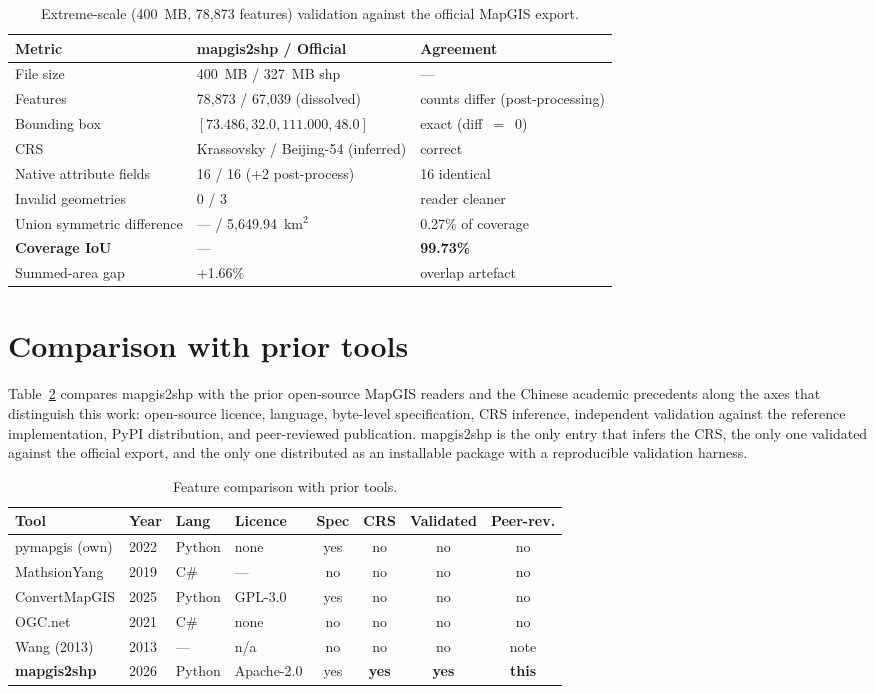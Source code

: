 \documentclass[11pt,a4paper]{article}
\begin{document}
\begin{table}[h]
\centering
\caption{Extreme-scale (400~MB, 78{,}873 features) validation against the official MapGIS export.}
\label{tab:large}
\begin{tabular}{lll}
\toprule
Metric & mapgis2shp / Official & Agreement \\
\midrule
File size & 400~MB / 327~MB shp & --- \\
Features & 78{,}873 / 67{,}039 (dissolved) & counts differ (post-processing) \\
Bounding box & $[73.486, 32.0, 111.000, 48.0]$ & exact (diff~$=$~0) \\
CRS & Krassovsky / Beijing-54 (inferred) & correct \\
Native attribute fields & 16 / 16 (+2 post-process) & 16 identical \\
Invalid geometries & 0 / 3 & reader cleaner \\
Union symmetric difference & --- / 5{,}649.94~km$^{2}$ & 0.27\% of coverage \\
\textbf{Coverage IoU} & --- & \textbf{99.73\%} \\
Summed-area gap & +1.66\% & overlap artefact \\
\bottomrule
\end{tabular}
\end{table}

\section{Comparison with prior tools}
Table~\ref{tab:tools} compares mapgis2shp with the prior open-source MapGIS readers and the Chinese academic precedents along the axes that distinguish this work: open-source licence, language, byte-level specification, CRS inference, independent validation against the reference implementation, PyPI distribution, and peer-reviewed publication. mapgis2shp is the only entry that infers the CRS, the only one validated against the official export, and the only one distributed as an installable package with a reproducible validation harness.

\begin{table}[h]
\centering
\caption{Feature comparison with prior tools.}
\label{tab:tools}
\begin{tabular}{llllcccc}
\toprule
Tool & Year & Lang & Licence & Spec & CRS & Validated & Peer-rev. \\
\midrule
pymapgis (own) & 2022 & Python & none & yes & no & no & no \\
MathsionYang & 2019 & C\# & --- & no & no & no & no \\
ConvertMapGIS & 2025 & Python & GPL-3.0 & yes & no & no & no \\
OGC.net & 2021 & C\# & none & no & no & no & no \\
Wang (2013) & 2013 & --- & n/a & no & no & no & note \\
\textbf{mapgis2shp} & 2026 & Python & Apache-2.0 & yes & \textbf{yes} & \textbf{yes} & \textbf{this} \\
\bottomrule
\end{tabular}
\end{table}
\end{document}
